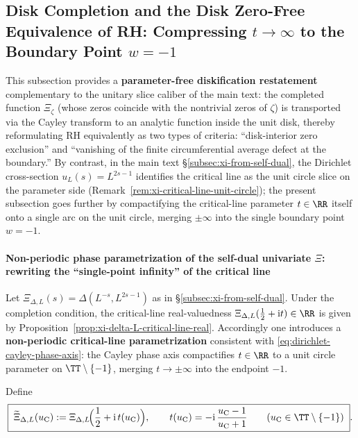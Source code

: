 \subsection{Disk Completion and the Disk Zero-Free Equivalence of RH: Compressing \texorpdfstring{$t\to\infty$}{t->infty} to the Boundary Point \texorpdfstring{$w=-1$}{w=-1}}\label{subsec:unit-disk-rh-equivalence}
This subsection provides a \textbf{parameter-free diskification restatement} complementary to the unitary slice caliber of the main text: the completed function \(\Xi_{\zeta}\) (whose zeros coincide with the nontrivial zeros of \(\zeta\)) is transported via the Cayley transform to an analytic function inside the unit disk, thereby reformulating RH equivalently as two types of criteria: ``disk-interior zero exclusion'' and ``vanishing of the finite circumferential average defect at the boundary.''
By contrast, in the main text \S\ref{subsec:xi-from-self-dual}, the Dirichlet cross-section \(u_L(s)=L^{2s-1}\) identifies the critical line as the unit circle slice on the parameter side (Remark~\ref{rem:xi-critical-line-unit-circle}); the present subsection goes further by compactifying the critical-line parameter \(t\in\RR\) itself onto a single arc on the unit circle, merging \(\pm\infty\) into the single boundary point \(w=-1\).

\paragraph{Non-periodic phase parametrization of the self-dual univariate \texorpdfstring{$\Xi$}{Xi}: rewriting the ``single-point infinity'' of the critical line}
Let \(\Xi_{\Delta,L}(s)=\Delta(L^{-s},L^{2s-1})\) as in \S\ref{subsec:xi-from-self-dual}.
Under the completion condition, the critical-line real-valuedness
\(
\Xi_{\Delta,L}(\tfrac12+\mathrm{i}t)\in\RR
\)
is given by Proposition~\ref{prop:xi-delta-L-critical-line-real}.
Accordingly one introduces a \textbf{non-periodic critical-line parametrization} consistent with \eqref{eq:dirichlet-cayley-phase-axis}: the Cayley phase axis compactifies \(t\in\RR\) to a unit circle parameter on \(\TT\setminus\{-1\}\), merging \(t\to\pm\infty\) into the endpoint \(-1\).

\begin{definition}\label{def:xi-nonperiodic-phase}
Define
\begin{equation}\label{eq:xi-nonperiodic-phase}
\boxed{\;
\widetilde{\Xi}_{\Delta,L}(u_{\mathrm C})
:=\Xi_{\Delta,L}\!\Bigl(\frac12+\mathrm{i}\,t(u_{\mathrm C})\Bigr),
\qquad
t(u_{\mathrm C})=-\mathrm{i}\,\frac{u_{\mathrm C}-1}{u_{\mathrm C}+1}
\qquad
(u_{\mathrm C}\in\TT\setminus\{-1\})\; }.
\end{equation}
\end{definition}

